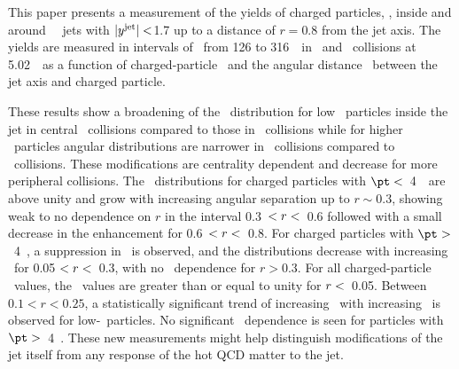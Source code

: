 
This paper presents a measurement of the yields of charged particles, \Dptr, inside and around \RFour\ \antikt\ jets with $|\mbox{$y^{\mathrm{jet}}$}| <$1.7 up to a distance of $r = 0.8$ from the jet axis. The yields are measured in intervals of \ptjet\ from 126 to 316~\GeV\ in \PbPb\ and \pp\ collisions at 5.02~\TeV\ as a function of charged-particle \pt\ and the angular distance \rvar\ between the jet axis and charged particle.


These results show a broadening of the \Dptr\ distribution for low \pt\ particles inside the jet
in central \pbpb\ collisions compared to those in \pp\ collisions while for higher \pt\ particles
angular distributions are narrower in \pbpb\ collisions compared to \pp\ collisions.
These modifications are centrality dependent and decrease for more peripheral collisions. 
The \RDptr\ distributions for charged particles with $\pt <$~4~\GeV\ 
are above unity and 
grow with increasing angular separation up to $r \sim0.3$, showing weak to no dependence on $r$ in the interval 0.3~$< \mbox{$r$} <$~0.6 followed with a small decrease in the enhancement for 0.6~$< \mbox{$r$} <$~0.8.
For charged particles with $\pt >$~4~\GeV, a suppression in \RDptr\ is observed, and the 
distributions decrease with increasing
\rvar\ for 0.05 $ < \mbox{$r$} < $~0.3, with no \rvar\ dependence for $r>0.3$. 
For all charged-particle \pt\ values, the \RDptr\ values are greater than or equal to unity for
$\mbox{$r$} <$~0.05.
Between $0.1 < r < 0.25$, a statistically significant trend of increasing \RDptr\ with increasing \ptjet\ is observed for low-\pt\ particles. No significant \ptjet\ dependence is seen for particles  with $\pt >$~4~\GeV.
These new measurements might help distinguish modifications of the jet itself
from any response of the hot QCD matter to the jet.



